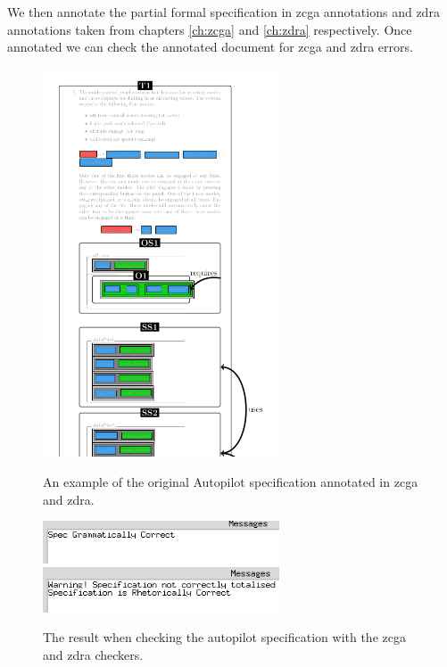 We then annotate the partial formal specification in \gls{zcga} annotations and
\gls{zdra} annotations taken from chapters \ref{ch:zcga} and \ref{ch:zdra}
respectively. Once annotated we can check the annotated document for \gls{zcga}
and \gls{zdra} errors. 

\begin{figure}[H]
\centering
\begin{minipage}{0.45\textwidth}
\centering
\includegraphics[width=7cm]{examples/semiform/1n2.png}
\vspace{-0.18in}
\caption{An example of the original Autopilot specification annotated in \gls{zcga} and \gls{zdra}. \label{fig:autopilot1n2}}
\vspace{-0.2in}
\end{minipage}\hfill
\begin{minipage}{0.45\textwidth}
\centering
\includegraphics[width=7cm]{examples/semiform/zcgacorrect.png}
\includegraphics[width=7cm]{examples/semiform/zdracorrect.png}
\vspace{-0.2in}
\caption{The result when checking the autopilot specification with the \gls{zcga} and \gls{zdra} checkers. \label{fig:autopilotcorrect}}
\vspace{-0.2in}
\end{minipage}
\end{figure}

